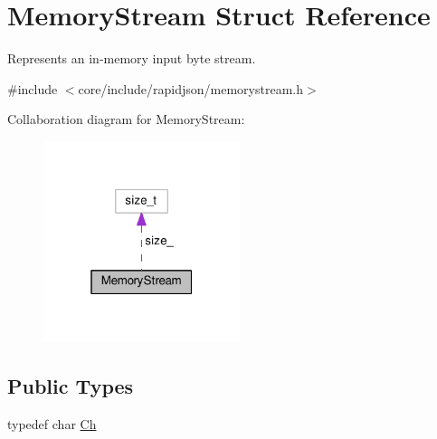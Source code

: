 \hypertarget{structMemoryStream}{}\section{Memory\+Stream Struct Reference}
\label{structMemoryStream}


Represents an in-\/memory input byte stream.  




{\ttfamily \#include $<$core/include/rapidjson/memorystream.\+h$>$}



Collaboration diagram for Memory\+Stream\+:
\nopagebreak
\begin{figure}[H]
\begin{center}
\leavevmode
\includegraphics[width=163pt]{structMemoryStream__coll__graph}
\end{center}
\end{figure}
\subsection*{Public Types}
\begin{DoxyCompactItemize}
\item 
typedef char \hyperlink{structMemoryStream_a62a1cbd052c325c83dbdb387d2f89088}{Ch}
\end{DoxyCompactItemize}
